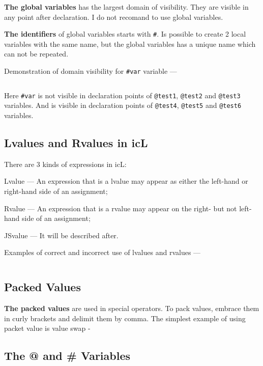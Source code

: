 \textbf{The global variables} has the largest domain of visibility. They are visible in any point after declaration. I do not recomand to use global variables.

{\bf The identifiers} of global variables starts with \texttt{#}. Is possible to create 2 local variables with the same name, but the global variables has a unique name which can not be repeated.

Demonstration of domain visibility for \texttt{#var} variable —
\inputminted[linenos]{icl}{../sources/globalvars.icL}

Here \texttt{#var} is not visible in declaration points of \texttt{@test1}, \texttt{@test2} and \texttt{@test3} variables. And is visible in declaration points of \texttt{@test4}, \texttt{@test5} and \texttt{@test6} variables.

\subsection{Lvalues and Rvalues in icL}

There are 3 kinds of expressions in icL:

\begin{icEnum}
\item
	Lvalue — An expression that is a lvalue may appear as either the left-hand or right-hand side of an assignment;
\item
	Rvalue — An expression that is a rvalue may appear on the right- but not left-hand side of an assignment;
\item
	JSvalue — It will be described after.
\end{icEnum}
Examples of correct and incorrect use of lvalues and rvalues —
\inputminted[linenos]{icl}{../sources/rlvalues.icL}

\subsection{Packed Values}

{\bf The packed values} are used in special operators. To pack values, embrace them in curly brackets and delimit them by comma. The simplest example of using packet value is value swap -

\subsection{The @ and \# Variables}

